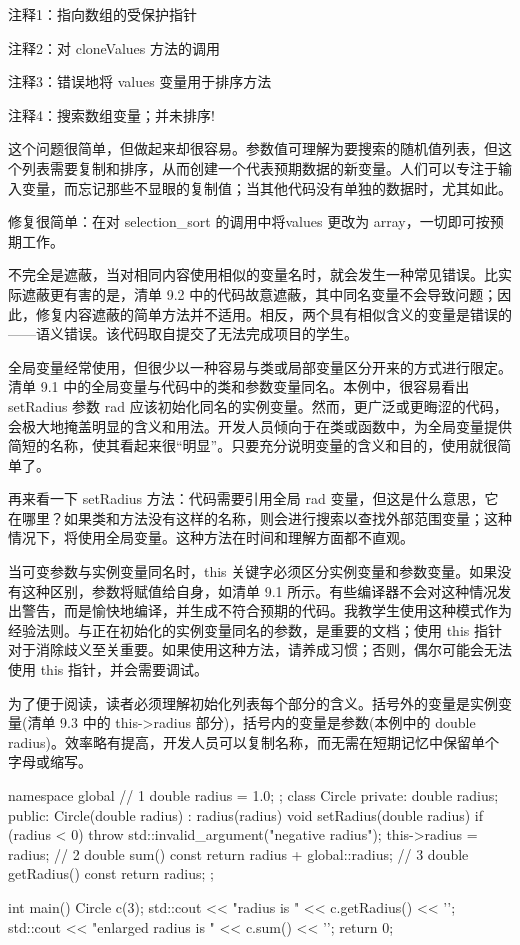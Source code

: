 {\footnotesize
注释1：指向数组的受保护指针

注释2：对 cloneValues 方法的调用

注释3：错误地将 values 变量用于排序方法

注释4：搜索数组变量；并未排序!
}

这个问题很简单，但做起来却很容易。参数值可理解为要搜索的随机值列表，但这个列表需要复制和排序，从而创建一个代表预期数据的新变量。人们可以专注于输入变量，而忘记那些不显眼的复制值；当其他代码没有单独的数据时，尤其如此。

修复很简单：在对 selection\_sort 的调用中将values 更改为 array，一切即可按预期工作。

不完全是遮蔽，当对相同内容使用相似的变量名时，就会发生一种常见错误。比实际遮蔽更有害的是，清单 9.2 中的代码故意遮蔽，其中同名变量不会导致问题；因此，修复内容遮蔽的简单方法并不适用。相反，两个具有相似含义的变量是错误的——语义错误。该代码取自提交了无法完成项目的学生。


全局变量经常使用，但很少以一种容易与类或局部变量区分开来的方式进行限定。清单 9.1 中的全局变量与代码中的类和参数变量同名。本例中，很容易看出 setRadius 参数 rad 应该初始化同名的实例变量。然而，更广泛或更晦涩的代码，会极大地掩盖明显的含义和用法。开发人员倾向于在类或函数中，为全局变量提供简短的名称，使其看起来很“明显”。只要充分说明变量的含义和目的，使用就很简单了。

再来看一下 setRadius 方法：代码需要引用全局 rad 变量，但这是什么意思，它在哪里？如果类和方法没有这样的名称，则会进行搜索以查找外部范围变量；这种情况下，将使用全局变量。这种方法在时间和理解方面都不直观。

当可变参数与实例变量同名时，this 关键字必须区分实例变量和参数变量。如果没有这种区别，参数将赋值给自身，如清单 9.1 所示。有些编译器不会对这种情况发出警告，而是愉快地编译，并生成不符合预期的代码。我教学生使用这种模式作为经验法则。与正在初始化的实例变量同名的参数，是重要的文档；使用 this 指针对于消除歧义至关重要。如果使用这种方法，请养成习惯；否则，偶尔可能会无法使用 this 指针，并会需要调试。


为了便于阅读，读者必须理解初始化列表每个部分的含义。括号外的变量是实例变量(清单 9.3 中的 this->radius 部分)，括号内的变量是参数(本例中的 double radius)。效率略有提高，开发人员可以复制名称，而无需在短期记忆中保留单个字母或缩写。


\begin{cpp}
namespace global { // 1
  double radius = 1.0;
};
class Circle {
private:
  double radius;
public:
  Circle(double radius) : radius(radius) {}
  void setRadius(double radius) {
    if (radius < 0)
      throw std::invalid_argument("negative radius");
    this->radius = radius; // 2
  }
  double sum() const {
    return radius + global::radius; // 3
  }
  double getRadius() const { return radius; }
};

int main() {
  Circle c(3);
  std::cout << "radius is " << c.getRadius() << '\n';
  std::cout << "enlarged radius is " << c.sum() << '\n';
  return 0;
}
\end{cpp}

